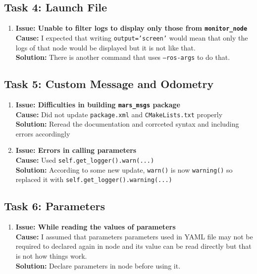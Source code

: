 \documentclass[12pt,a4paper]{article}
\begin{document}
\subsection{Task 4: Launch File}
\begin{enumerate}[leftmargin=*]
    \item \textbf{Issue: Unable to filter logs to display only those from \texttt{monitor\_node}}\\
    \textbf{Cause:} I expected that writing \texttt{output='screen'} would mean that only the logs of that node would be displayed but it is not like that.\\
    \textbf{Solution:} There is another command that uses \texttt{--ros-args} to do that.
\end{enumerate}

\subsection{Task 5: Custom Message and Odometry}
\begin{enumerate}[leftmargin=*]
    \item \textbf{Issue: Difficulties in building \texttt{mars\_msgs} package}\\
    \textbf{Cause:} Did not update \texttt{package.xml} and \texttt{CMakeLists.txt} properly\\
    \textbf{Solution:} Reread the documentation and corrceted syntax and including errors accordingly
    
    \item \textbf{Issue: Errors in calling parameters}\\
    \textbf{Cause:} Used \texttt{self.get\_logger().warn(...)}\\
    \textbf{Solution:} According to some new update, \texttt{warn()} is now \texttt{warning()} so replaced it with \texttt{self.get\_logger().warning(...)}
\end{enumerate}

\subsection{Task 6: Parameters}
\begin{enumerate}[leftmargin=*]
    \item \textbf{Issue: While reading the values of parameters}\\
    \textbf{Cause:} I assumed that parameters parameters used in YAML file may not be required to declared again in node and its value can be read directly but that is not how things work.\\
    \textbf{Solution:} Declare parameters in node before using it.
\end{enumerate}
\end{document}
